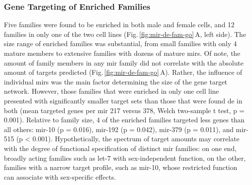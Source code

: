 \subsubsection{Gene Targeting of Enriched Families}
Five families were found to be enriched in both male and female cells, and 12 families in only one of the two cell lines (Fig.\,\ref{fig:mir-de-fam-go}\,A, left side). The size range of enriched families was substantial, from small families with only 4 mature members to extensive families with dozens of mature \acp{mir}. Of note, the amount of family members in any \ac{mir} family did not correlate with the absolute amount of targets predicted (Fig.\,\ref{fig:mir-de-fam-go}\,A). Rather, the influence of individual \acp{mir} was the main factor determining the size of the gene target network. However, those families that were enriched in only one cell line presented with significantly smaller target sets than those that were found \ac{de} in both (mean targeted genes per \ac{mir} 217 versus 378, Welch two-sample t test, p = 0.001). Relative to family size, 4 of the enriched families targeted less genes than all others: mir-10 (p = 0.016), mir-192 (p = 0.042), mir-379 (p = 0.011), and mir-515 (p < 0.001). Hypothetically, the spectrum of target amounts may correlate with the degree of functional specification of distinct \ac{mir} families: on one end, broadly acting families such as let-7 with sex-independent function, on the other, families with a narrow target profile, such as mir-10, whose restricted function can associate with sex-specific effects.

